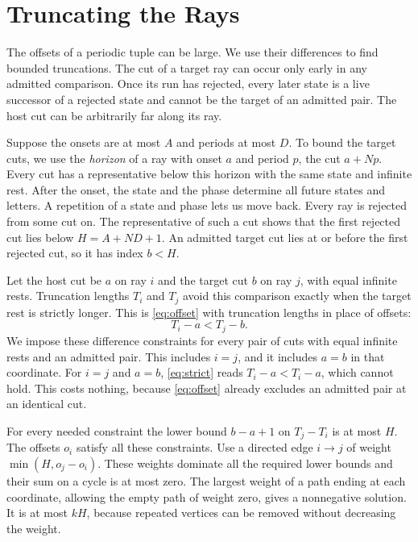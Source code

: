 \section{Truncating the Rays}
\label{sec:truncation}

The offsets of a periodic tuple can be large. We use their differences
to find bounded truncations. The cut of a target ray can occur only early
in any admitted comparison. Once its run has rejected, every later
state is a live successor of a rejected state and cannot be the target
of an admitted pair. The host cut can be arbitrarily far
along its ray.

Suppose the onsets are at most $A$ and periods at most $D$. To bound the
target cuts, we use the \emph{horizon} of a ray with onset $a$ and period
$p$, the cut $a+Np$.
Every cut has a representative below this horizon with the same state
and infinite rest. After the onset, the state and the phase determine
all future states and letters. A repetition of a state and phase lets
us move back. Every ray is rejected from some cut on. The representative
of such a cut shows that the first rejected cut lies below
$H=A+ND+1$. An admitted target cut lies at or before the first rejected
cut, so it has index $b<H$.

Let the host cut be $a$ on ray $i$ and the target cut $b$ on ray $j$, with
equal infinite rests. Truncation lengths $T_i$ and $T_j$ avoid this
comparison exactly when the target rest is strictly longer. This is
\eqref{eq:offset} with truncation lengths in place of offsets:
\begin{equation}
   T_i-a < T_j-b .
   \label{eq:strict}
\end{equation}
We impose these difference constraints for every pair of cuts
with equal infinite rests and an admitted pair. This includes $i=j$,
and it includes $a=b$ in that coordinate. For $i=j$ and $a=b$,
\eqref{eq:strict} reads $T_i-a<T_i-a$, which cannot hold. This costs
nothing, because \eqref{eq:offset} already excludes an admitted pair at an
identical cut.

For every needed constraint the lower bound $b-a+1$ on $T_j-T_i$
is at most $H$. The offsets $o_i$ satisfy all these constraints.
Use a directed edge $i\to j$ of weight $\min(H,o_j-o_i)$.
These weights dominate all the required lower bounds and their sum on
a cycle is at most zero. The largest weight of a path ending at each
coordinate, allowing the empty path of weight zero, gives a
nonnegative solution. It is at most $kH$, because repeated vertices
can be removed without decreasing the weight.

